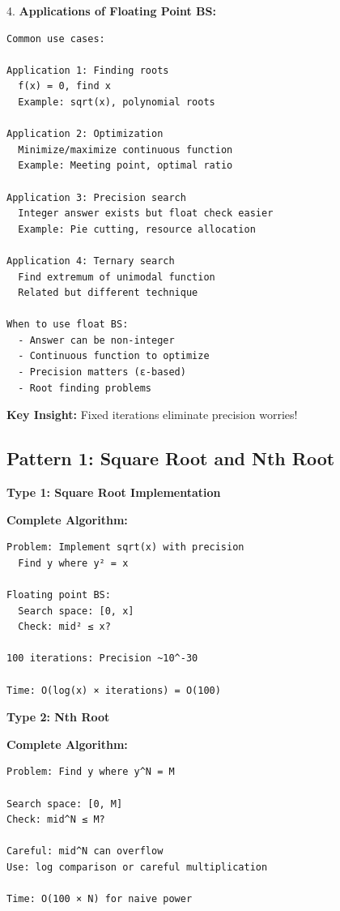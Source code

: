 \documentclass[11pt,a4paper,oneside]{book}
\begin{document}
\begin{tcolorbox}[
    enhanced,breakable,
    colback=white,
    colframe=deepblue,
    boxrule=1.5pt,
    arc=3mm,
    title=\textbf{Working with Real Numbers}
]
4. \textbf{Applications of Floating Point BS:}
\begin{verbatim}
Common use cases:

Application 1: Finding roots
  f(x) = 0, find x
  Example: sqrt(x), polynomial roots

Application 2: Optimization
  Minimize/maximize continuous function
  Example: Meeting point, optimal ratio

Application 3: Precision search
  Integer answer exists but float check easier
  Example: Pie cutting, resource allocation

Application 4: Ternary search
  Find extremum of unimodal function
  Related but different technique

When to use float BS:
  - Answer can be non-integer
  - Continuous function to optimize
  - Precision matters (ε-based)
  - Root finding problems
\end{verbatim}

\textbf{Key Insight:}
Fixed iterations eliminate precision worries!
\end{tcolorbox}

\subsection{Pattern 1: Square Root and Nth Root}

\begin{tcolorbox}[
    enhanced,breakable,
    colback=successgreen!10,
    colframe=successgreen,
    boxrule=1.5pt,
    arc=3mm,
    title=\textbf{Complete Root Finding Algorithms}
]
\textbf{Type 1: Square Root Implementation}

\textbf{Complete Algorithm:}
\begin{verbatim}
Problem: Implement sqrt(x) with precision
  Find y where y² = x
  
Floating point BS:
  Search space: [0, x]
  Check: mid² ≤ x?
  
100 iterations: Precision ~10^-30

Time: O(log(x) × iterations) = O(100)
\end{verbatim}

\textbf{Type 2: Nth Root}

\textbf{Complete Algorithm:}
\begin{verbatim}
Problem: Find y where y^N = M
  
Search space: [0, M]
Check: mid^N ≤ M?

Careful: mid^N can overflow
Use: log comparison or careful multiplication

Time: O(100 × N) for naive power
\end{verbatim}
\end{tcolorbox}
\end{document}
